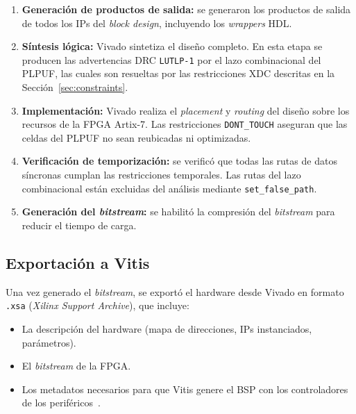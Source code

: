 \begin{enumerate}
  \item \textbf{Generación de productos de salida:} se generaron los
    productos de salida de todos los IPs del \textit{block design},
    incluyendo los \textit{wrappers} HDL.

  \item \textbf{Síntesis lógica:} Vivado sintetiza el diseño completo. En
    esta etapa se producen las advertencias DRC \texttt{LUTLP-1} por el lazo
    combinacional del PLPUF, las cuales son resueltas por las restricciones
    XDC descritas en la Sección~\ref{sec:constraints}.

  \item \textbf{Implementación:} Vivado realiza el \textit{placement} y
    \textit{routing} del diseño sobre los recursos de la FPGA Artix-7. Las
    restricciones \texttt{DONT\_TOUCH} aseguran que las celdas del PLPUF no
    sean reubicadas ni optimizadas.

  \item \textbf{Verificación de temporización:} se verificó que todas las
    rutas de datos síncronas cumplan las restricciones temporales. Las rutas
    del lazo combinacional están excluidas del análisis mediante
    \texttt{set\_false\_path}.

  \item \textbf{Generación del \textit{bitstream}:} se habilitó la
    compresión del \textit{bitstream} para reducir el tiempo de
    carga.
\end{enumerate}

\subsection{Exportación a Vitis}
\label{sec:export_xsa}

Una vez generado el \textit{bitstream}, se exportó el hardware desde Vivado
en formato \texttt{.xsa} (\textit{Xilinx Support Archive}), que incluye:

\begin{itemize}
  \item La descripción del hardware (mapa de direcciones, IPs instanciados,
    parámetros).
  \item El \textit{bitstream} de la FPGA.
  \item Los metadatos necesarios para que Vitis genere el BSP con los
    controladores de los periféricos~\cite{ug1701}.
\end{itemize}

